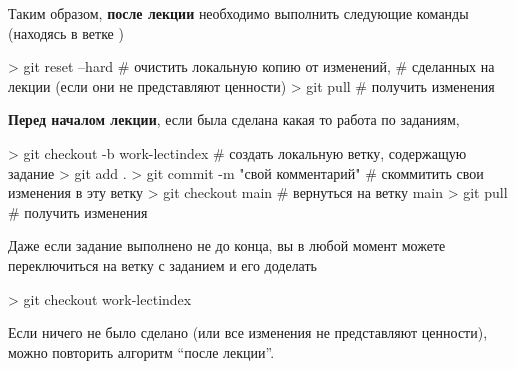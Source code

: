 Таким образом, {\bf после лекции} необходимо выполнить следующие команды (находясь в ветке )
\begin{shelloutput}
> git reset --hard  # очистить локальную копию от изменений,
                    # сделанных на лекции (если они не представляют ценности)
> git pull          # получить изменения
\end{shelloutput}

{\bf Перед началом лекции}, если была сделана какая то работа по заданиям,
\begin{shelloutput}
> git checkout -b work-lect{index}    # создать локальную ветку, содержащую задание
> git add .
> git commit -m "{свой комментарий}"  # скоммитить свои изменения в эту ветку
> git checkout main                   # вернуться на ветку main
> git pull                            # получить изменения
\end{shelloutput}

Даже если задание выполнено не до конца, вы в любой момент можете переключиться на ветку с заданием и его доделать
\begin{shelloutput}
> git checkout work-lect{index}
\end{shelloutput}

Если ничего не было сделано (или все изменения не представляют ценности), можно повторить алгоритм ``после лекции''.
